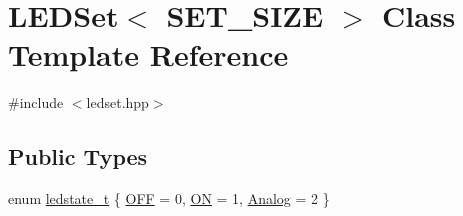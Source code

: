 \hypertarget{classLEDSet}{}\section{L\+E\+D\+Set$<$ S\+E\+T\+\_\+\+S\+I\+ZE $>$ Class Template Reference}
\label{classLEDSet}


{\ttfamily \#include $<$ledset.\+hpp$>$}

\subsection*{Public Types}
\begin{DoxyCompactItemize}
\item 
enum \hyperlink{classLEDSet_ae26a13b2d33c51351bc6d0acdf2a94a4}{ledstate\+\_\+t} \{ \hyperlink{classLEDSet_ae26a13b2d33c51351bc6d0acdf2a94a4a786545571f352fd284991e5fcdb79238}{O\+FF} = 0, 
\hyperlink{classLEDSet_ae26a13b2d33c51351bc6d0acdf2a94a4a1e073152d5525648a5bb26cf3eb98ea2}{ON} = 1, 
\hyperlink{classLEDSet_ae26a13b2d33c51351bc6d0acdf2a94a4a2c0806958e37c8d87bd57df8990b30eb}{Analog} = 2
 \}
\end{DoxyCompactItemize}
